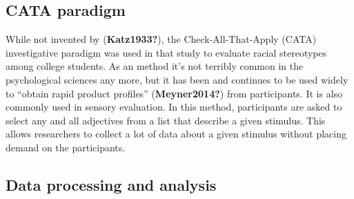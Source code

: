 \documentclass[
  english,
  man,floatsintext]{apa6}
\begin{document}
\hypertarget{cata-paradigm}{%
\subsection{CATA paradigm}\label{cata-paradigm}}

While not invented by (\textbf{Katz1933?}), the Check-All-That-Apply (CATA) investigative paradigm was used in that study to evaluate racial stereotypes among college students. As an method it's not terribly common in the psychological sciences any more, but it has been and continues to be used widely to ``obtain rapid product profiles'' (\textbf{Meyner2014?}) from participants. It is also commonly used in sensory evaluation. In this method, participants are asked to select any and all adjectives from a list that describe a given stimulus. This allows researchers to collect a lot of data about a given stimulus without placing demand on the participants.

\hypertarget{data-processing-and-analysis}{%
\subsection{Data processing and analysis}\label{data-processing-and-analysis}}
\end{document}
